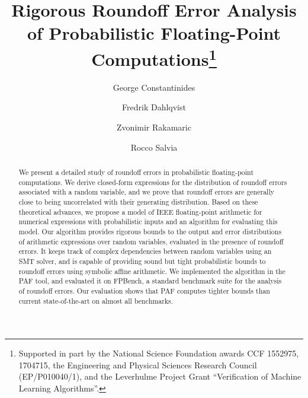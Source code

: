 \documentclass[runningheads]{llncs}
\begin{document}
\title{Rigorous Roundoff Error Analysis of Probabilistic Floating-Point
Computations\thanks{Supported in part by the National Science
Foundation awards CCF 1552975, 1704715,  the Engineering and Physical
Sciences Research Council (EP/P010040/1), and the Leverhulme Project Grant ``Verification of Machine Learning Algorithms''.}}


\author{George Constantinides \and
Fredrik Dahlqvist \and
Zvonimir Rakamaric\and Rocco Salvia}



\maketitle              %

\begin{abstract}
We present a detailed study of roundoff errors in probabilistic floating-point computations.
We derive closed-form expressions for the distribution of roundoff errors associated with a random variable, and we prove that roundoff errors are generally close to being uncorrelated with their generating distribution. Based on these theoretical advances, we propose a model of IEEE floating-point arithmetic for numerical expressions with probabilistic inputs and an algorithm for evaluating this model.  Our algorithm provides rigorous bounds to the output and error distributions of arithmetic expressions over random variables, evaluated in the presence of roundoff errors.  It keeps track of complex dependencies between random variables using an SMT solver,  and is capable of providing sound but tight probabilistic bounds to roundoff errors using symbolic affine arithmetic.  We implemented the algorithm in the PAF tool, and evaluated it on FPBench, a standard benchmark suite for the analysis of roundoff errors. Our evaluation shows that PAF computes tighter bounds than current state-of-the-art on almost all benchmarks.
\end{abstract}












\newpage




\newpage


\end{document}
